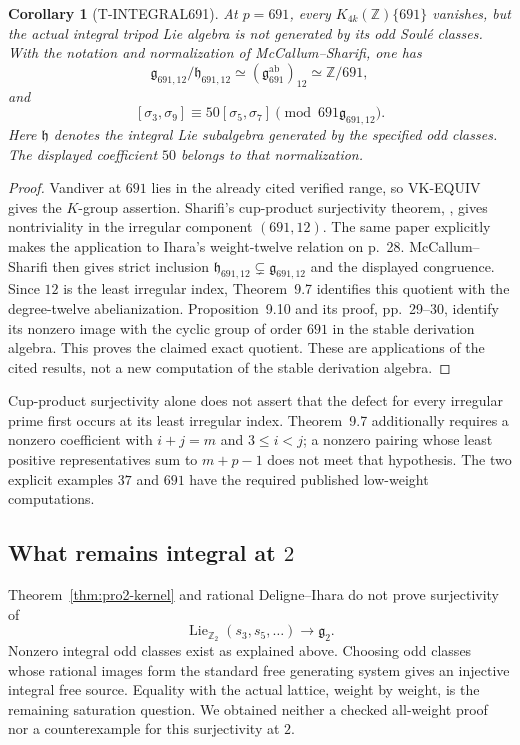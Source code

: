 \documentclass[11pt,a4paper]{article}
\newtheorem{corollary}[theorem]{Corollary}
\theoremstyle{definition}
\begin{document}
\begin{corollary}[T-INTEGRAL691]
At $p=691$, every $K_{4k}(\mathbb Z)\{691\}$ vanishes, but the
actual integral tripod Lie algebra is not generated by its odd
Soul\'e classes. With the notation and normalization of
McCallum--Sharifi, one has
\[
 \mathfrak g_{691,12}/\mathfrak h_{691,12}
 \simeq (\mathfrak g_{691}^{\mathrm{ab}})_{12}
 \simeq\mathbb Z/691,
\]
and
\[
 [\sigma_3,\sigma_9]\equiv50[\sigma_5,\sigma_7]
       \pmod{691\mathfrak g_{691,12}}.
\]
Here $\mathfrak h$ denotes the integral Lie subalgebra generated by
the specified odd classes. The displayed coefficient $50$ belongs
to that normalization.
\end{corollary}

\begin{proof}
Vandiver at $691$ lies in the already cited verified range, so
VK-EQUIV gives the $K$-group assertion. Sharifi's cup-product
surjectivity theorem, \cite[Theorem~1.2, p.~2; Corollary~5.9,
p.~27]{Sharifi2007}, gives nontriviality in the irregular component
$(691,12)$. The same paper explicitly makes the application to
Ihara's weight-twelve relation on p.~28.
McCallum--Sharifi \cite[Theorem~9.11, p.~30]{McCallumSharifi2003}
then gives strict inclusion $\mathfrak h_{691,12}\subsetneq
\mathfrak g_{691,12}$ and the displayed congruence. Since $12$ is
the least irregular index, Theorem~9.7 identifies this quotient
with the degree-twelve abelianization. Proposition~9.10 and its
proof, pp.~29--30, identify its nonzero image with the cyclic
group of order $691$ in the stable derivation algebra. This proves
the claimed exact quotient. These are applications of the cited
results, not a new computation of the stable derivation algebra.
\end{proof}

Cup-product surjectivity alone does not assert that the defect for
every irregular prime first occurs at its least irregular index.
Theorem~9.7 additionally requires a nonzero coefficient with
$i+j=m$ and $3\le i<j$; a nonzero pairing whose least positive
representatives sum to $m+p-1$ does not meet that hypothesis.
The two explicit examples $37$ and $691$ have the required
published low-weight computations.

\subsection{What remains integral at \texorpdfstring{$2$}{2}}

Theorem~\ref{thm:pro2-kernel} and rational Deligne--Ihara do not prove surjectivity of
\[
 \operatorname{Lie}_{\mathbb Z_2}(s_3,s_5,\ldots)
      \longrightarrow\mathfrak g_2.
\]
Nonzero integral odd classes exist as explained above. Choosing odd classes whose rational images form the standard free generating system gives an injective integral free source. Equality with the actual lattice, weight by weight, is the remaining saturation question. We obtained neither a checked all-weight proof nor a counterexample for this surjectivity at $2$.
\end{document}
